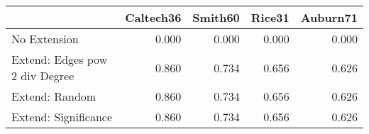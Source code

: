 \begin{tabular}{lrrrr}
\toprule
{} & Caltech36 & Smith60 & Rice31 & Auburn71 \\
\midrule
No Extension                   &     0.000 &   0.000 &  0.000 &    0.000 \\
Extend: Edges pow 2 div Degree &     0.860 &   0.734 &  0.656 &    0.626 \\
Extend: Random                 &     0.860 &   0.734 &  0.656 &    0.626 \\
Extend: Significance           &     0.860 &   0.734 &  0.656 &    0.626 \\
\bottomrule
\end{tabular}
